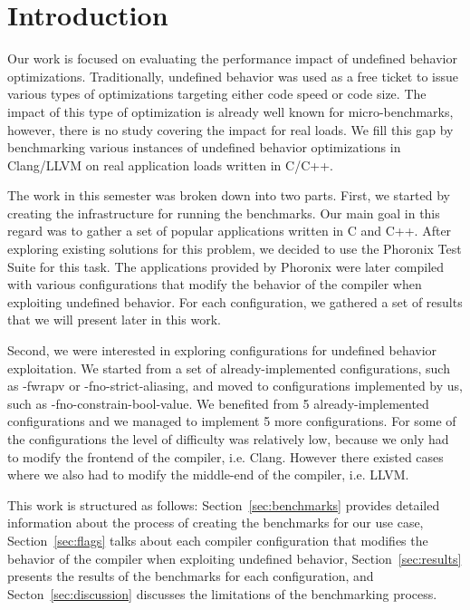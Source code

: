 \section{Introduction}

Our work is focused on evaluating the performance impact of undefined behavior
optimizations. Traditionally, undefined behavior was used as a free ticket to
issue various types of optimizations targeting either code speed or code size.
The impact of this type of optimization is already well known for
micro-benchmarks, however, there is no study covering the impact for real loads.
We fill this gap by benchmarking various instances of undefined behavior
optimizations in Clang/LLVM on real application loads written in C/C++.

The work in this semester was broken down into two parts. First, we started by
creating the infrastructure for running the benchmarks. Our main goal in this
regard was to gather a set of popular applications written in C and C++. After
exploring existing solutions for this problem, we decided to use the Phoronix
Test Suite for this task. The applications provided by Phoronix were later
compiled with various configurations that modify the behavior of the compiler
when exploiting undefined behavior. For each configuration, we gathered a set of
results that we will present later in this work.

Second, we were interested in exploring configurations for undefined behavior
exploitation. We started from a set of already-implemented configurations, such
as -fwrapv or -fno-strict-aliasing, and moved to configurations implemented by
us, such as -fno-constrain-bool-value. We benefited from 5 already-implemented
configurations and we managed to implement 5 more configurations. For some of
the configurations the level of difficulty was relatively low, because we only
had to modify the frontend of the compiler, i.e. Clang. However there existed
cases where we also had to modify the middle-end of the compiler, i.e. LLVM.

This work is structured as follows: Section~\ref{sec:benchmarks} provides
detailed information about the process of creating the benchmarks for our use
case, Section~\ref{sec:flags} talks about each compiler configuration that
modifies the behavior of the compiler when exploiting undefined behavior,
Section~\ref{sec:results} presents the results of the benchmarks for each
configuration, and Secton~\ref{sec:discussion} discusses the limitations of the
benchmarking process.
